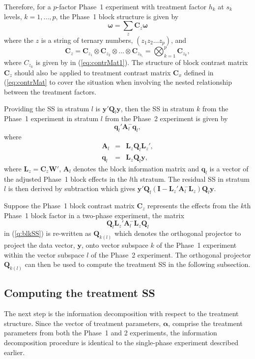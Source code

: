 \documentclass[article]{jss}
\newcommand{\I}{\mathbf{I}}
\newcommand{\Q}{\mathbf{Q}}
\newcommand{\A}{\mathbf{A}}
\newcommand{\C}{\mathbf{C}}
\newcommand{\mL}{\mathbf{L}}
\newcommand{\W}{\mathbf{W}}
\begin{document}
Therefore, for a $p$-factor Phase~1 experiment with treatment factor $h_k$ at $s_k$ levels, $k = 1, \dots, p$, the Phase~1 block structure is given by  
\begin{equation}
\bm{\omega} = \sum_z{\C_z\bm{\omega}}
\end{equation}
where the $z$ is a string of ternary numbers, $(z_1 z_2 \dots z_{p})$, and 
\[
\C_z =  \C_{z_1} \otimes  \C_{z_2} \otimes \dots \otimes  \C_{z_{b_1}} = \bigotimes^{p} _{k = 1} \C_{z_k},
\]
where $C_{z_k}$ is given by in (\ref{eq:contrMat1}). The structure of block contrast matrix $\C_{z}$ should also be applied to treatment contrast matrix $\C_{x}$ defined in (\ref{eq:contrMat} to cover the situation when involving the nested relationship between the treatment factors.

Providing the SS in stratum $l$ is $\bm{y}' \Q_l \bm{y}$, then the SS in stratum $k$ from the Phase~1 experiment in stratum $l$ from the Phase~2 experiment is given by 
\begin{equation}\label{eq:blkSS}
 \bm{q}_{l}' \A_{l}^{-} \bm{q}_{l},
\end{equation}
where
\begin{eqnarray*}
\A_l &=& \mL_{z}\Q_l\mL_{z}',\\
\bm{q}_l &=& \mL_{z}\Q_l \bm{y},
\end{eqnarray*}
where $\mL_{z} = \C_z \W'$, $\A_l$ denotes the block information matrix and $\bm{q}_l$ is a vector of the adjusted Phase~1 block effects in the $l$th stratum. The residual SS in stratum $l$ is then derived by subtraction which gives $\bm{y}'\Q_l( \I - \mL_{z}' \A_{l}^{-} \mL_{z}) \Q_l\bm{y}$.

Suppose the Phase~1 block contrast matrix $\C_z$ represents the effects from the $k$th Phase~1 block factor in a two-phase experiment, the matrix 
\[
\Q_l\mL_{z}' \A_{l}^{-} \mL_{z}\Q_l
\]
in (\ref{q:blkSS}) is re-written as $\Q_{k(l)}$ which denotes the orthogonal projector to project the data vector, $\bm{y}$, onto vector subspace $k$ of the Phase~1 experiment within the vector subspace $l$ of the Phase~2 experiment. The orthogonal projector $\Q_{k(l)}$ can then be used to compute the treatment SS in the following subsection.

\subsection{Computing the treatment SS}
\label{subsec:trtDecomp}
The next step is the information decomposition with respect to the treatment structure. Since the vector of treatment parameters, $\bm{\alpha}$, comprise the treatment parameters from both the Phase~1 and 2 experiments, the information decomposition procedure is identical to the single-phase experiment described earlier. 
\end{document}
